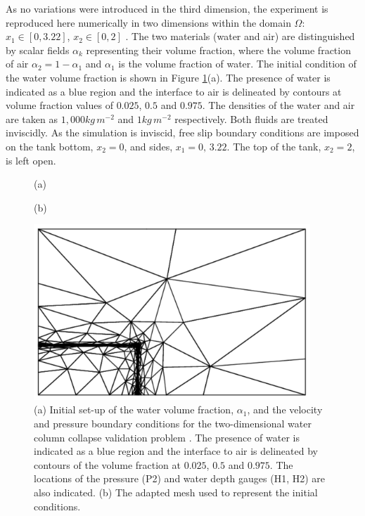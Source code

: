 As no variations were introduced in the third dimension, the experiment is reproduced here numerically in two dimensions within the domain $\Omega$: $x_1 \in [0,3.22]$, $x_2 \in [0,2]$ \citep{lee_numerical_2002, colagrossi_numerical_2003, park_volume-of-fluid_2009}.  The two materials (water and air) are distinguished by scalar fields $\alpha_k$ representing their volume fraction, where the volume fraction of air $\alpha_2 = 1-\alpha_1$ and $\alpha_1$ is the volume fraction of water. The initial condition of the water volume fraction is shown in Figure \ref{fig:zhouinitial}(a).  The presence of water is indicated as a blue region and the interface to air is delineated by contours at volume fraction values of $0.025$, $0.5$ and $0.975$.  The densities of the water and air are taken as $ 1,000kg\,m^{-2}$ and $1kg\,m^{-2}$ respectively.  Both fluids are treated inviscidly. As the simulation is inviscid, free slip boundary conditions are imposed on the tank bottom, $x_2=0$, and sides, $x_1=0,\,3.22$.  The top of the tank, $x_2=2$, is left open.

\begin{figure}[tbp]
\hspace{1cm}(a)
\begin{center}
\hspace{0.4cm}
\end{center}
\hspace{1cm}(b)
\begin{center}
\includegraphics[width=10.4cm, clip=true]{examples_images/water_collapse/water_collapse_0_mesh.pdf}
\end{center}
\caption{(a) Initial set-up of the water volume fraction, $\alpha_1$, and the velocity and pressure boundary conditions for the two-dimensional water column collapse validation problem \citep{zhou_nonlinear_1999}. The presence of water is indicated as a blue region and the interface to air is delineated by contours of the volume fraction at $0.025$, $0.5$ and $0.975$.  The locations of the pressure (P2) and water depth gauges (H1, H2) are also indicated. (b) The adapted mesh used to represent the initial conditions.}
\label{fig:zhouinitial}
\end{figure}

